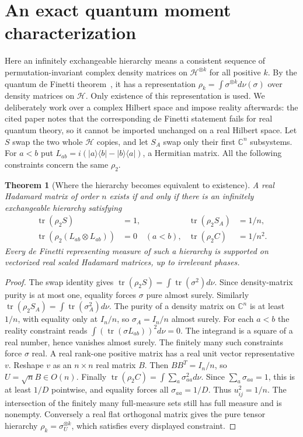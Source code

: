 \documentclass[11pt]{article}
\newtheorem{theorem}{Theorem}[section]
\newcommand{\tr}{\operatorname{tr}}
\begin{document}
\section{An exact quantum moment characterization}
Here an infinitely exchangeable hierarchy means a consistent sequence
of permutation-invariant complex density matrices on
$\mathcal H^{\otimes k}$ for all positive $k$. By the quantum de Finetti
theorem~\cite{CFS}, it has a representation
$\rho_k=\int\sigma^{\otimes k}d\nu(\sigma)$ over density matrices on
$\mathcal H$. Only existence of this representation is used.
We deliberately work over a complex Hilbert space and impose reality
afterwards: the cited paper notes that the corresponding de Finetti
statement fails for real quantum theory, so it cannot be imported
unchanged on a real Hilbert space.
Let $S$ swap the two whole $\mathcal H$ copies, and let $S_A$ swap
only their first $\mathbb C^n$ subsystems. For $a<b$ put
$L_{ab}=i(|a\rangle\langle b|-|b\rangle\langle a|)$, a Hermitian
matrix. All the following constraints concern the same $\rho_2$.
\begin{theorem}[Where the hierarchy becomes equivalent to existence]
A real Hadamard matrix of order $n$ exists if and only if there is
an infinitely exchangeable hierarchy satisfying
\begin{align*}
 \tr(\rho_2S)&=1,& \tr(\rho_2S_A)&=1/n,\\
 \tr(\rho_2(L_{ab}\otimes L_{ab}))&=0\quad(a<b),&
 \tr(\rho_2 C)&=1/n^2.
\end{align*}
Every de Finetti representing measure of such a hierarchy is supported
on vectorized real scaled Hadamard matrices, up to irrelevant phases.
\end{theorem}
\begin{proof}
The swap identity gives $\tr(\rho_2S)=\int\tr(\sigma^2)d\nu$.
Since density-matrix purity is at most one, equality forces $\sigma$
pure almost surely. Similarly
$\tr(\rho_2S_A)=\int\tr(\sigma_A^2)d\nu$. The purity of a density
matrix on $\mathbb C^n$ is at least $1/n$, with equality only at
$I_n/n$, so $\sigma_A=I_n/n$ almost surely.
For each $a<b$ the reality constraint reads
$\int(\tr(\sigma L_{ab}))^2d\nu=0$. The integrand is a square of a
real number, hence vanishes almost surely. The finitely many such
constraints force $\sigma$ real. A real rank-one positive matrix has
a real unit vector representative $v$. Reshape $v$ as an $n\times n$
real matrix $B$. Then $BB^T=I_n/n$, so $U=\sqrt nB\in O(n)$.
Finally $\tr(\rho_2 C)=\int\sum_a\sigma_{aa}^2d\nu$.
Since $\sum_a\sigma_{aa}=1$, this is at least $1/D$ pointwise,
and equality forces all $\sigma_{aa}=1/D$. Thus $u_{ij}^2=1/n$.
The intersection of the finitely many full-measure sets still has
full measure and is nonempty. Conversely a real flat orthogonal
matrix gives the pure tensor hierarchy $\rho_k=\sigma_U^{\otimes k}$,
which satisfies every displayed constraint.
\end{proof}
\end{document}
